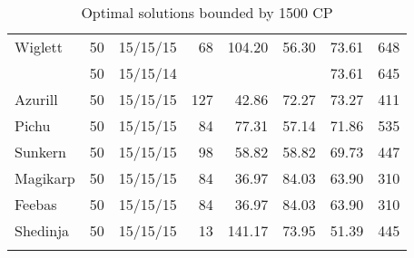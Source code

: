 \begin{longtable}{lrrrrrrr}
Wiglett & 50 & 15/15/15 & 68 & 104.20 & 56.30 & 73.61 &  648\\
 & 50 & 15/15/14 & & & & 73.61 &  645\\
Azurill & 50 & 15/15/15 & 127 & 42.86 & 72.27 & 73.27 &  411\\
Pichu & 50 & 15/15/15 & 84 & 77.31 & 57.14 & 71.86 &  535\\
Sunkern & 50 & 15/15/15 & 98 & 58.82 & 58.82 & 69.73 &  447\\
Magikarp & 50 & 15/15/15 & 84 & 36.97 & 84.03 & 63.90 &  310\\
Feebas & 50 & 15/15/15 & 84 & 36.97 & 84.03 & 63.90 &  310\\
Shedinja & 50 & 15/15/15 & 13 & 141.17 & 73.95 & 51.39 &  445\\
\caption{Optimal solutions bounded by 1500 CP}
\label{table:cp1500}
\end{longtable}
\endgroup
\begingroup
\nohyphenation
\footnotesize
\setlength{\tabcolsep}{1pt}
